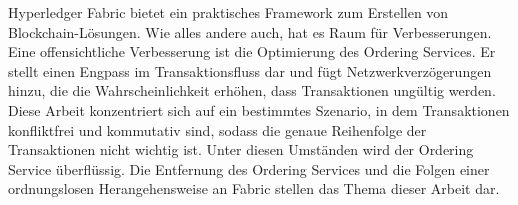 Hyperledger Fabric bietet ein praktisches Framework zum Erstellen von Blockchain-Lösungen. Wie alles andere auch, hat es Raum für Verbesserungen. Eine offensichtliche Verbesserung ist die Optimierung des Ordering Services. Er stellt einen Engpass im Transaktionsfluss dar und fügt Netzwerkverzögerungen hinzu, die die Wahrscheinlichkeit erhöhen, dass Transaktionen ungültig werden. Diese Arbeit konzentriert sich auf ein bestimmtes Szenario, in dem Transaktionen konfliktfrei und kommutativ sind, sodass die genaue Reihenfolge der Transaktionen nicht wichtig ist. Unter diesen Umständen wird der Ordering Service überflüssig. Die Entfernung des Ordering Services und die Folgen einer ordnungslosen Herangehensweise an Fabric stellen das Thema dieser Arbeit dar.
